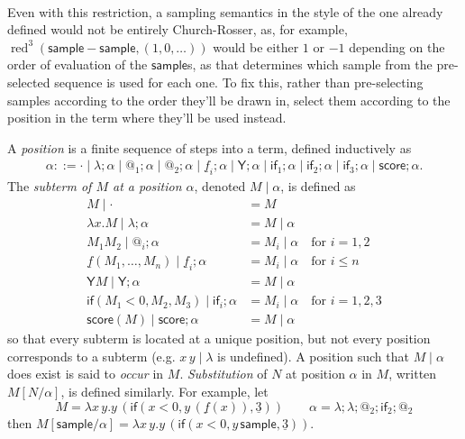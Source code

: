 \documentclass{article}
\newcommand{\tY}{\mathsf{Y}}
\newcommand{\tif}[3]{\mathsf{if}(#1, #2, #3)} %
\newcommand{\tsample}{\mathsf{sample}}
\newcommand{\tscore}{\mathsf{score}}
\DeclareMathOperator{\red}{red}
\theoremstyle{definition}
\theoremstyle{lemma}
\theoremstyle{remark}
\begin{document}
\paragraph{}
Even with this restriction, a sampling semantics in the style of the one already defined would not be entirely Church-Rosser, as, for example, $\red^3(\tsample - \tsample, (1,0,\dots))$ would be either $1$ or $-1$ depending on the order of evaluation of the $\tsample$s, as that determines which sample from the pre-selected sequence is used for each one. To fix this, rather than pre-selecting samples according to the order they'll be drawn in, select them according to the position in the term where they'll be used instead.

A \emph{position} 
is a finite sequence of steps into a term, defined inductively as
\begin{align*}
\alpha ::= \cdot \mid \lambda ; \alpha \mid @_1 ; \alpha \mid @_2 ; \alpha \mid \underline f_i ; \alpha \mid \tY ; \alpha \mid \textsf{if}_1 ; \alpha \mid \textsf{if}_2 ; \alpha \mid \textsf{if}_3 ; \alpha \mid \tscore ; \alpha.
\end{align*}
The \emph{subterm of $M$ at a position $\alpha$}, denoted $M \mid \alpha$, is defined as
\begin{align*}
M \mid \cdot & = M \\
\lambda x. M \mid \lambda ; \alpha & = M \mid \alpha \\
M_1 M_2 \mid @_i ; \alpha & = M_i \mid \alpha \quad \text{for } i = 1,2 \\
\underline f(M_1,\dots,M_n) \mid \underline f_i ; \alpha & = M_i \mid \alpha \quad \text{for }i \leq n \\
\tY M \mid \tY ; \alpha & = M \mid \alpha \\
\tif{M_1 < 0}{M_2}{M_3} \mid \textsf{if}_i ; \alpha & = M_i \mid \alpha \quad \text{for } i = 1,2,3 \\
\tscore(M) \mid \tscore ; \alpha & = M \mid \alpha
\end{align*}
so that every subterm is located at a unique position, but not every position corresponds to a subterm (e.g. $x \, y \mid \lambda$ is undefined). 
A position such that $M\mid \alpha$ does exist is said to \emph{occur} in $M$. 
\emph{Substitution} of $N$ at position $\alpha$ in $M$, written $M[N/\alpha]$, is defined similarly.
For example, let 
\[
M = \lambda x \, y. y \, (\tif{x < 0}{y \, (\underline f (x))}{\underline 3})
\qquad
\alpha =\lambda ; \lambda ; @_2 ; \textsf{if}_2 ; @_2
\]
then 
\(
M[\tsample / \alpha] = \lambda x \, y. y \, (\tif{x < 0}{y \, \tsample}{\underline 3}).
\)
\end{document}
